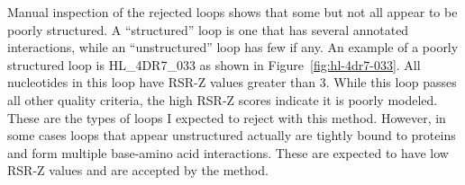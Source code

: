 
Manual inspection of the rejected loops shows that some but not all appear to be
poorly structured. A ``structured'' loop is one that has several annotated
interactions, while an ``unstructured'' loop has few if any. An example of a
poorly structured loop is HL\_4DR7\_033 as shown in
Figure~\ref{fig:hl-4dr7-033}. All nucleotides in this loop have RSR-Z values
greater than 3. While this loop passes all other quality criteria, the high
RSR-Z scores indicate it is poorly modeled. These are the types of loops I
expected to reject with this method. However, in some cases loops that appear
unstructured actually are tightly bound to proteins and form multiple base-amino
acid interactions. These are expected to have low RSR-Z values and are accepted
by the method.

